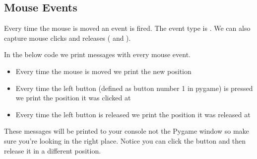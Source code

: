 \documentclass[letterpaper,10pt,english]{sphinxmanual}
\begin{document}
\subsection{Mouse Events}
\label{week_3/index:mouse-events}
Every time the mouse is moved an event is fired. The event type is . We can also capture mouse clicks and releases ( and ).

In the below code we print messages with every mouse event.
\begin{itemize}
\item {} 
Every time the mouse is moved we print the new position

\item {} 
Every time the left button (defined as button number 1 in pygame) is pressed we print the position it was clicked at

\item {} 
Every time the left button is released we print the position it was released at

\end{itemize}

These messages will be printed to your console not the Pygame window so make sure you're looking in the right place. Notice you can click the button and then release it in a different position.
\end{document}
